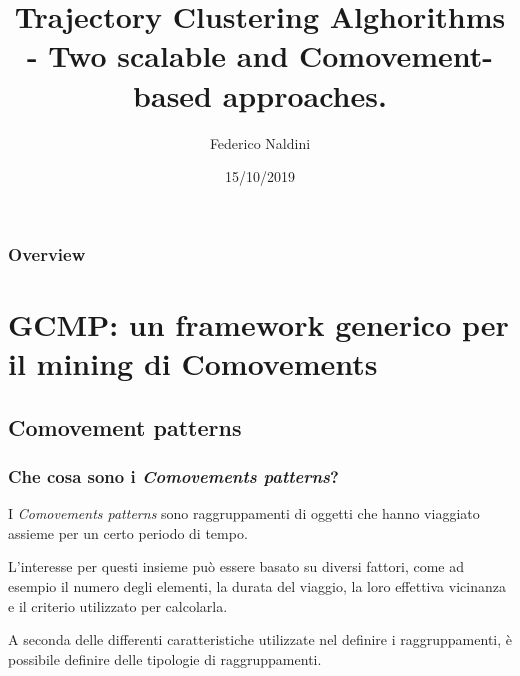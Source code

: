 \documentclass{beamer}
\title[Trajectory Clustering survey]{Trajectory Clustering Alghorithms - Two scalable and Comovement-based approaches. } %
\author{Federico Naldini} %
\institute[Università di Bologna] %
{
Alma Mater Studiorum - Università di Bologna, Cesena. \\ %
\medskip
\textit{federico.naldini3@studio.unibo.it} %
}
\date{15/10/2019} %
\begin{document}
\begin{frame}
\titlepage %
\end{frame}

\begin{frame}
\frametitle{Overview} %
\tableofcontents %
\end{frame}

\section{GCMP: un framework generico per il mining di Comovements}
\subsection{Comovement patterns} %

\begin{frame}

\frametitle{Che cosa sono i \textit{Comovements patterns}?}
I \textit{Comovements patterns} sono raggruppamenti di oggetti che hanno viaggiato assieme per un certo periodo di tempo.

L'interesse per questi insieme può essere basato su diversi fattori, come ad esempio il numero degli elementi, la durata del viaggio,
la loro effettiva vicinanza e il criterio utilizzato per calcolarla.

A seconda delle differenti caratteristiche utilizzate nel definire i raggruppamenti, è possibile definire delle tipologie di raggruppamenti.

\end{frame}
\end{document}
